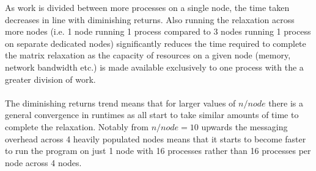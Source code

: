 \documentclass[11pt]{article}
\begin{document}
\begin{minipage}[t]{0.55\textwidth}
As work is divided between more processes on a single node, the time taken decreases in line with diminishing returns. Also running the relaxation across more nodes (i.e. 1 node running 1 process compared to 3 nodes running 1 process on separate dedicated nodes) significantly reduces the time required to complete the matrix relaxation as the capacity of resources on a given node (memory, network bandwidth etc.) is made available exclusively to one process with the a greater division of work. 
\\
\\
The diminishing returns trend means that for larger values of $n/node$ there is a general convergence in runtimes as all start to take similar amounts of time to complete the relaxation. Notably from $n/node=10$ upwards the messaging overhead across 4 heavily populated nodes means that it starts to become faster to run the program on just 1 node with 16 processes rather than 16 processes per node across 4 nodes.
\end{minipage}
\end{document}
